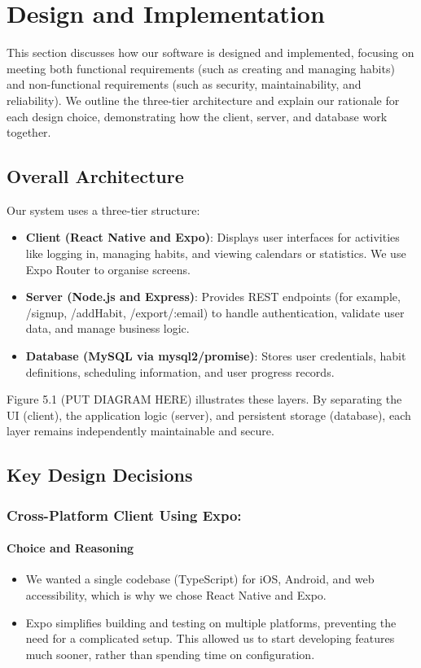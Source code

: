 \section{Design and Implementation}

This section discusses how our software is designed and implemented, focusing on meeting both functional requirements (such as creating and managing habits) and non-functional requirements (such as security, maintainability, and reliability). We outline the three-tier architecture and explain our rationale for each design choice, demonstrating how the client, server, and database work together.

\subsection{Overall Architecture}

Our system uses a three-tier structure: \begin{itemize} \item \textbf{Client (React Native and Expo)}:
Displays user interfaces for activities like logging in, managing habits, and viewing calendars or statistics. We use Expo Router to organise screens.
\item \textbf{Server (Node.js and Express)}:
Provides REST endpoints (for example, /signup, /addHabit, /export/:email) to handle authentication, validate user data, and manage business logic.
\item \textbf{Database (MySQL via mysql2/promise)}:
Stores user credentials, habit definitions, scheduling information, and user progress records. \end{itemize}

Figure 5.1 (PUT DIAGRAM HERE) illustrates these layers. By separating the UI (client), the application logic (server), and persistent storage (database), each layer remains independently maintainable and secure.

\subsection{Key Design Decisions}

\subsubsection{Cross-Platform Client Using Expo:}

\paragraph{Choice and Reasoning} \begin{itemize} \item We wanted a single codebase (TypeScript) for iOS, Android, and web accessibility, which is why we chose React Native and Expo.
\item Expo simplifies building and testing on multiple platforms, preventing the need for a complicated setup. This allowed us to start developing features much sooner, rather than spending time on configuration.  \end{itemize}


